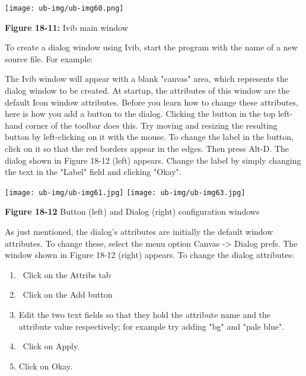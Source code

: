 \begin{center}
\texttt{[image: ub-img/ub-img60.png]}
\end{center}

{\sffamily\bfseries Figure 18-11:}
{\sffamily Ivib main window}

To create a dialog window using Ivib, start the program with the name of
a new source file. For example:


The Ivib window will appear with a blank
"canvas" area, which represents the dialog
window to be created. At startup, the attributes of this window are the
default Icon window attributes. Before you learn how to change these
attributes, here is how you add a button to the dialog. Clicking the
button in the top left-hand corner of the toolbar does this. Try moving
and resizing the resulting button by left-clicking on it with the
mouse. To change the label in the button, click on it so that the red
borders appear in the edges. Then press Alt-D. The dialog shown in
Figure 18-12 (left) appears.
Change the label by simply changing the text in the
"Label" field and clicking "Okay".

\bigskip

\noindent \texttt{[image: ub-img/ub-img61.jpg]}
\texttt{[image: ub-img/ub-img63.jpg]}

{\sffamily\bfseries Figure 18-12}
{\sffamily Button (left) and Dialog (right) configuration windows}

\bigskip

As just mentioned, the dialog's attributes are
initially the default window attributes. To change these, select the
menu option Canvas -{\textgreater} Dialog prefs. The window shown in
Figure 18-12 (right) appears. To change the dialog attributes:

\begin{enumerate}
\item \ Click on the Attribs tab

\item \ Click on the Add button


\item Edit the two text fields so that they hold the attribute name and
the attribute value respectively; for example try adding
"bg" and "pale blue".
\item \ Click on Apply.

\item Click on Okay.
\end{enumerate}

